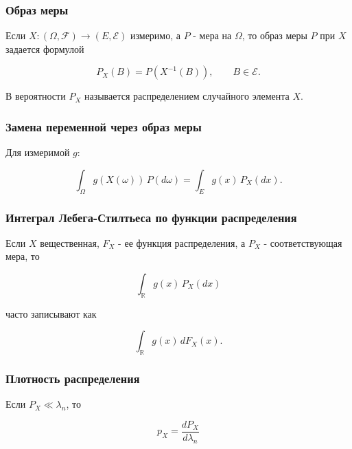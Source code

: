 \documentclass[
  11pt,
  a4paper,
]{article}
\begin{document}
\subsubsection{Образ
меры}\label{ux43eux431ux440ux430ux437-ux43cux435ux440ux44b}

Если \(X:(\Omega,\mathcal F)\to(E,\mathcal E)\) измеримо, а \(P\) - мера
на \(\Omega\), то образ меры \(P\) при \(X\) задается формулой

\[
P_X(B)=P(X^{-1}(B)),
\qquad B\in\mathcal E.
\]

В вероятности \(P_X\) называется распределением случайного элемента
\(X\).

\subsubsection{Замена переменной через образ
меры}\label{ux437ux430ux43cux435ux43dux430-ux43fux435ux440ux435ux43cux435ux43dux43dux43eux439-ux447ux435ux440ux435ux437-ux43eux431ux440ux430ux437-ux43cux435ux440ux44b}

Для измеримой \(g\):

\[
\int_\Omega g(X(\omega))\,P(d\omega)
=
\int_E g(x)\,P_X(dx).
\]

\subsubsection{Интеграл Лебега-Стилтьеса по функции
распределения}\label{ux438ux43dux442ux435ux433ux440ux430ux43b-ux43bux435ux431ux435ux433ux430-ux441ux442ux438ux43bux442ux44cux435ux441ux430-ux43fux43e-ux444ux443ux43dux43aux446ux438ux438-ux440ux430ux441ux43fux440ux435ux434ux435ux43bux435ux43dux438ux44f}

Если \(X\) вещественная, \(F_X\) - ее функция распределения, а \(P_X\) -
соответствующая мера, то

\[
\int_{\mathbb R} g(x)\,P_X(dx)
\]

часто записывают как

\[
\int_{\mathbb R} g(x)\,dF_X(x).
\]

\subsubsection{Плотность
распределения}\label{ux43fux43bux43eux442ux43dux43eux441ux442ux44c-ux440ux430ux441ux43fux440ux435ux434ux435ux43bux435ux43dux438ux44f}

Если \(P_X\ll\lambda_n\), то

\[
p_X=\frac{dP_X}{d\lambda_n}
\]
\end{document}
